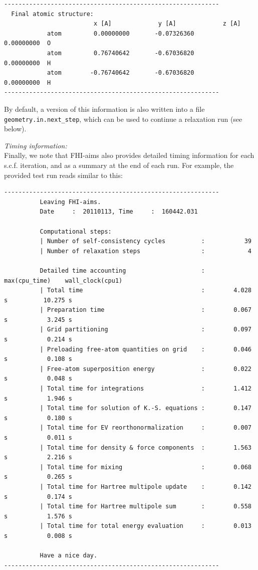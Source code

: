 {\small
\begin{verbatim}
------------------------------------------------------------
  Final atomic structure:
                         x [A]             y [A]             z [A]
            atom         0.00000000       -0.07326360        0.00000000  O
            atom         0.76740642       -0.67036820        0.00000000  H
            atom        -0.76740642       -0.67036820        0.00000000  H
------------------------------------------------------------
\end{verbatim}
}

By default, a version of this information is also written into a file 
\texttt{geometry.in.next\_step},
which can be used to continue a relaxation run (see below).

\emph{Timing information:} \\
Finally, we note that FHI-aims also provides detailed timing
information for each s.c.f. iteration, and as a summary at the end of
each run. For example, the provided test run reads similar to this:

{\small
\begin{verbatim}
------------------------------------------------------------
          Leaving FHI-aims.
          Date     :  20110113, Time     :  160442.031

          Computational steps:
          | Number of self-consistency cycles          :           39
          | Number of relaxation steps                 :            4

          Detailed time accounting                     :  max(cpu_time)    wall_clock(cpu1)
          | Total time                                 :        4.028 s          10.275 s
          | Preparation time                           :        0.067 s           3.245 s
          | Grid partitioning                          :        0.097 s           0.214 s
          | Preloading free-atom quantities on grid    :        0.046 s           0.108 s
          | Free-atom superposition energy             :        0.022 s           0.048 s
          | Total time for integrations                :        1.412 s           1.946 s
          | Total time for solution of K.-S. equations :        0.147 s           0.180 s
          | Total time for EV reorthonormalization     :        0.007 s           0.011 s
          | Total time for density & force components  :        1.563 s           2.216 s
          | Total time for mixing                      :        0.068 s           0.265 s
          | Total time for Hartree multipole update    :        0.142 s           0.174 s
          | Total time for Hartree multipole sum       :        0.558 s           1.576 s
          | Total time for total energy evaluation     :        0.013 s           0.008 s

          Have a nice day.
------------------------------------------------------------
\end{verbatim}
}

